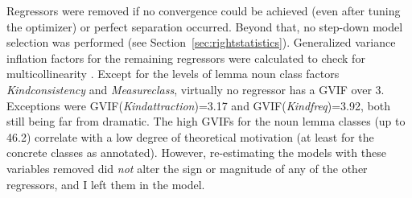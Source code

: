 \documentclass[USenglish]{article}
\begin{document}
%

Regressors were removed if no convergence could be achieved (even after tuning the optimizer) or perfect separation occurred.
Beyond that, no step-down model selection was performed (see Section~\ref{sec:rightstatistics}).
Generalized variance inflation factors for the remaining regressors were calculated to check for multicollinearity \citep{FoxMonette1992}.
Except for the levels of lemma noun class factors \textit{Kindconsistency} and \textit{Measureclass}, virtually no regressor has a GVIF over 3.
Exceptions were GVIF(\textit{Kindattraction})=3.17 and GVIF(\textit{Kindfreq})=3.92, both still being far from dramatic.
The high GVIFs for the noun lemma classes (up to 46.2) correlate with a low degree of theoretical motivation (at least for the concrete classes as annotated).
However, re-estimating the models with these variables removed did \textit{not} alter the sign or magnitude of any of the other regressors, and I left them in the model.
\end{document}
